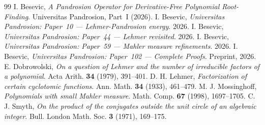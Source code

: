 \documentclass[11pt,a4paper]{article}
\begin{document}
\begin{thebibliography}{99}
 I. Besevic, \textit{A Pandrosion Operator for Derivative-Free Polynomial Root-Finding}. Universitas Pandrosion, Part~I (2026).
 I. Besevic, \textit{Universitas Pandrosion: Paper~10 --- Lehmer-Pandrosion energy}. 2026.
 I. Besevic, \textit{Universitas Pandrosion: Paper~44 --- Lehmer revisited}. 2026.
 I. Besevic, \textit{Universitas Pandrosion: Paper~59 --- Mahler measure refinements}. 2026.
 I. Besevic, \textit{Universitas Pandrosion: Paper~102 --- Complete Proofs}. Preprint, 2026.
 E. Dobrowolski, \textit{On a question of Lehmer and the number of irreducible factors of a polynomial}. Acta Arith. \textbf{34} (1979), 391--401.
 D. H. Lehmer, \textit{Factorization of certain cyclotomic functions}. Ann. Math. \textbf{34} (1933), 461--479.
 M. J. Mossinghoff, \textit{Polynomials with small Mahler measure}. Math. Comp. \textbf{67} (1998), 1697--1705.
 C. J. Smyth, \textit{On the product of the conjugates outside the unit circle of an algebraic integer}. Bull. London Math. Soc. \textbf{3} (1971), 169--175.
\end{thebibliography}
\end{document}

